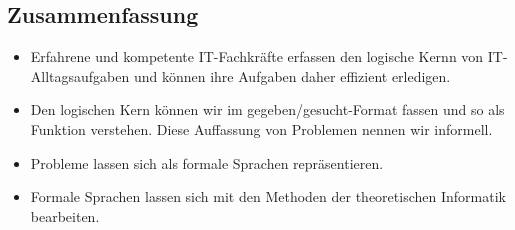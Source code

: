 \subsection{Zusammenfassung}
\begin{itemize}
    \item Erfahrene und kompetente IT-Fachkräfte erfassen den logische Kernn
        von IT-Alltagsaufgaben und können ihre Aufgaben daher effizient erledigen.
    \item Den logischen Kern können wir im gegeben/gesucht-Format fassen
        und so als Funktion verstehen. Diese Auffassung von Problemen nennen wir informell.
    \item Probleme lassen sich als formale Sprachen repräsentieren.
    \item Formale Sprachen lassen sich mit den Methoden der theoretischen Informatik
        bearbeiten.
\end{itemize}
